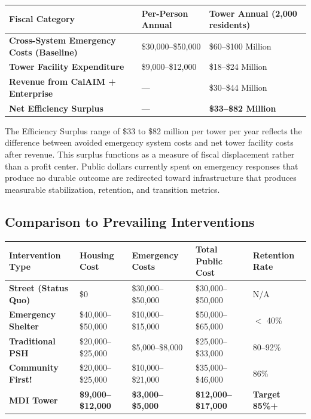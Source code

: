 \documentclass[12pt, letterpaper]{article}
\begin{document}
\begin{table}[H]
\centering
\begin{tabularx}{\textwidth}{@{}lXX@{}}
\toprule
\textbf{Fiscal Category} & \textbf{Per-Person Annual} & \textbf{Tower Annual (2,000 residents)} \\
\midrule
\textbf{Cross-System Emergency Costs (Baseline)} & \$30,000--\$50,000 & \$60--\$100 Million \\
\textbf{Tower Facility Expenditure} & \$9,000--\$12,000 & \$18--\$24 Million \\
\textbf{Revenue from CalAIM + Enterprise} & --- & \$30--\$44 Million \\
\textbf{Net Efficiency Surplus} & --- & \textbf{\$33--\$82 Million} \\
\bottomrule
\end{tabularx}
\end{table}

The Efficiency Surplus range of \$33 to \$82 million per tower per year reflects the difference between avoided emergency system costs and net tower facility costs after revenue. This surplus functions as a measure of fiscal displacement rather than a profit center. Public dollars currently spent on emergency responses that produce no durable outcome are redirected toward infrastructure that produces measurable stabilization, retention, and transition metrics.

\subsection{Comparison to Prevailing Interventions}

\begin{table}[H]
\centering
\begin{tabularx}{\textwidth}{@{}lXXXX@{}}
\toprule
\textbf{Intervention Type} & \textbf{Housing Cost} & \textbf{Emergency Costs} & \textbf{Total Public Cost} & \textbf{Retention Rate} \\
\midrule
\textbf{Street (Status Quo)} & \$0 & \$30,000--\$50,000 & \$30,000--\$50,000 & N/A \\
\textbf{Emergency Shelter} & \$40,000--\$50,000 & \$10,000--\$15,000 & \$50,000--\$65,000 & $<$ 40\% \\
\textbf{Traditional PSH} & \$20,000--\$25,000 & \$5,000--\$8,000 & \$25,000--\$33,000 & 80--92\% \\
\textbf{Community First!} & \$20,000--\$25,000 & \$10,000--\$21,000 & \$35,000--\$46,000 & 86\% \\
\textbf{MDI Tower} & \textbf{\$9,000--\$12,000} & \textbf{\$3,000--\$5,000} & \textbf{\$12,000--\$17,000} & \textbf{Target 85\%+} \\
\bottomrule
\end{tabularx}
\end{table}
\end{document}
